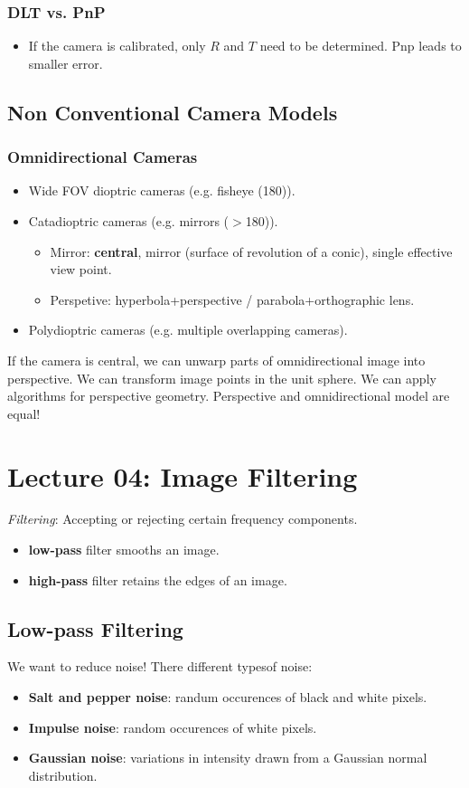 \documentclass[a4paper,12 pt]{article}
\theoremstyle{definition}
\theoremstyle{remark}
\theoremstyle{definition}
\theoremstyle{definition}
\theoremstyle{definition}
\theoremstyle{remark}
\theoremstyle{definition}
\begin{document}
\subsubsection*{DLT vs. PnP}
\begin{itemize}
\item If the camera is calibrated, only $R$ and $T$ need to be determined. Pnp leads to smaller error.
\end{itemize}
\subsection*{Non Conventional Camera Models}
\subsubsection*{Omnidirectional Cameras}
\begin{itemize}
\item Wide FOV dioptric cameras (e.g. fisheye (180)). 
\item Catadioptric cameras (e.g. mirrors ($>$180)). 
\begin{itemize}
\item Mirror: \textbf{central}, mirror (surface of revolution of a conic), single effective view point.
\item Perspetive: hyperbola+perspective / parabola+orthographic lens.
\end{itemize}
\item Polydioptric cameras (e.g. multiple overlapping cameras).
\end{itemize}
If the camera is central, we can unwarp parts of omnidirectional image into perspective. We can transform image points in the unit sphere. We can apply algorithms for perspective geometry. Perspective and omnidirectional model are equal!
\newpage
\section*{Lecture 04: Image Filtering}
\textit{Filtering}: Accepting or rejecting certain frequency components.
\begin{itemize}
\item \textbf{low-pass} filter smooths an image.
\item \textbf{high-pass} filter retains the edges of an image.
\end{itemize}
\subsection*{Low-pass Filtering}
We want to reduce noise! There different typesof noise:
\begin{itemize}
\item \textbf{Salt and pepper noise}: randum occurences of black and white pixels.
\item \textbf{Impulse noise}: random occurences of white pixels.
\item \textbf{Gaussian noise}: variations in intensity drawn from a Gaussian normal distribution.
\end{itemize}
\end{document}
